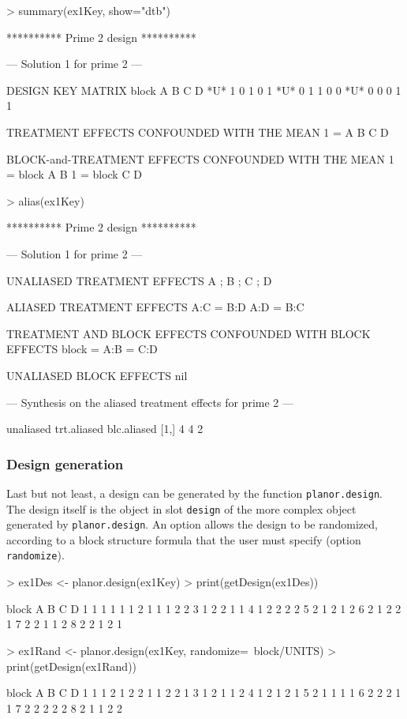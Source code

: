 \documentclass[a4paper]{article}
\begin{document}
\begin{Schunk}
\begin{Sinput}
> summary(ex1Key, show="dtb")
\end{Sinput}
\begin{Soutput}
********** Prime  2  design **********

--- Solution  1  for prime  2  ---

DESIGN KEY MATRIX
    block A B C D
*U*     1 0 1 0 1
*U*     0 1 1 0 0
*U*     0 0 0 1 1

TREATMENT EFFECTS CONFOUNDED WITH THE MEAN
1 = A B C D

BLOCK-and-TREATMENT EFFECTS CONFOUNDED WITH THE MEAN
1 = block A B
1 = block C D
\end{Soutput}
\begin{Sinput}
> alias(ex1Key)
\end{Sinput}
\begin{Soutput}
********** Prime  2  design **********

--- Solution  1  for prime  2  ---

UNALIASED TREATMENT EFFECTS
A ; B ; C ; D

ALIASED TREATMENT EFFECTS
A:C = B:D
A:D = B:C

TREATMENT AND BLOCK EFFECTS CONFOUNDED WITH BLOCK EFFECTS
block = A:B = C:D

UNALIASED BLOCK EFFECTS
nil


--- Synthesis on the aliased treatment effects for prime  2  ---

     unaliased trt.aliased blc.aliased
[1,]         4           4           2
\end{Soutput}
\end{Schunk}

\subsubsection{Design generation}
Last but not least, a design can be generated by the function
\texttt{planor.design}. The design itself is the object in slot
\texttt{design} of the more complex object generated by
\texttt{planor.design}. An option allows the design to be randomized,
according to a block structure formula that the user must specify
(option \texttt{randomize}).
\begin{Schunk}
\begin{Sinput}
> ex1Des <- planor.design(ex1Key)
> print(getDesign(ex1Des))
\end{Sinput}
\begin{Soutput}
  block A B C D
1     1 1 1 1 1
2     1 1 1 2 2
3     1 2 2 1 1
4     1 2 2 2 2
5     2 1 2 1 2
6     2 1 2 2 1
7     2 2 1 1 2
8     2 2 1 2 1
\end{Soutput}
\begin{Sinput}
> ex1Rand <- planor.design(ex1Key, randomize=~block/UNITS)
> print(getDesign(ex1Rand))
\end{Sinput}
\begin{Soutput}
  block A B C D
1     1 1 2 1 2
2     1 1 2 2 1
3     1 2 1 1 2
4     1 2 1 2 1
5     2 1 1 1 1
6     2 2 2 1 1
7     2 2 2 2 2
8     2 1 1 2 2
\end{Soutput}
\end{Schunk}
\end{document}
